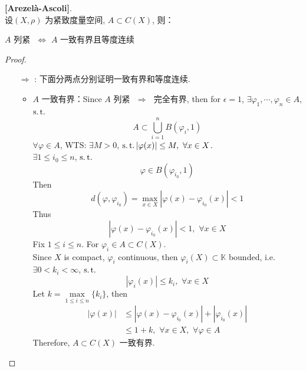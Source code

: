 	\begin{thm}\label{thm 1.8.1}
		\textbf{[Arezel\`{a}-Ascoli]}. \\
		设$(X , \rho)$ 为紧致度量空间, $A \subset C(X)$, 则：
		\begin{center}
			$A$ 列紧 $\,\, \Leftrightarrow \,\, A$ 一致有界且等度连续
		\end{center}
		
		\vspace{4em}
		
		\begin{proof}
			\begin{enumerate}
				\item[$\Rightarrow$]: 下面分两点分别证明一致有界和等度连续.
				\begin{itemize}
					\item $A$ 一致有界：Since $A$ 列紧 $\,\, \Rightarrow \,\,$ 完全有界, then for $\epsilon = 1$, $\exists \varphi_1 , \cdots , \varphi_n \in A$, $\operatorname{s.t.}$
					\[ A \subset \bigcup_{i = 1}^{n} B(\varphi_i , 1) \]
					$\forall \varphi \in A$, WTS: $\exists M > 0$, $\operatorname{s.t.} \left| \varphi(x) \right| \leq M , \,\, \forall x \in X$. \\
					$\exists 1 \leq i_0 \leq n$, $\operatorname{s.t.}$
					\[ \varphi \in B(\varphi_{i_0} , 1) \]
					Then
					\[ d(\varphi , \varphi_{i_0}) = \max_{x \in X} \left| \varphi(x) - \varphi_{i_0}(x) \right| < 1 \]
					Thus
					\[ \left| \varphi(x) - \varphi_{i_0}(x) \right| < 1 , \,\, \forall x \in X \]
					Fix $1 \leq i \leq n$. For $\varphi_i \in A \subset C(X)$. \\
					Since $X$ is compact, $\varphi_i$ continuous, then $\varphi_{i}(X) \subset \mathbb{K}$ bounded, i.e. $\exists 0 < k_i < \infty$, $\operatorname{s.t.}$
					\[ \left| \varphi_{i}(x) \right| \leq k_i , \,\, \forall x \in X \]
					Let $k = \underset{1 \leq i \leq n}{\max}{\{ k_i \}}$, then
					\begin{align}
						\left| \varphi(x) \right| 
						&\leq \left| \varphi(x) - \varphi_{i_0}(x) \right| + \left| \varphi_{i_0}(x) \right| \\
						&\leq 1 + k , \,\, \forall x \in X , \,\, \forall \varphi \in A
					\end{align}
					Therefore, $A \subset C(X)$ 一致有界.
					
					\newpage
					

\end{itemize}
\end{enumerate}
\end{proof}
\end{thm}
